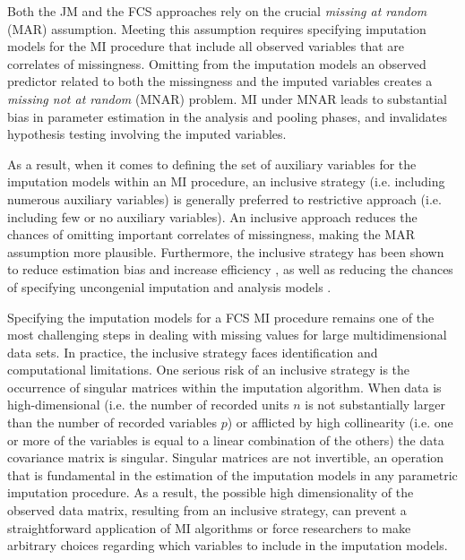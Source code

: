 Both the JM and the FCS approaches rely on the crucial \emph{missing at random} (MAR) assumption.
Meeting this assumption requires specifying imputation models for the MI procedure that include all observed
variables that are correlates of missingness.
Omitting from the imputation models an observed predictor related to both the missingness and the imputed variables 
creates a \emph{missing not at random} (MNAR) problem.
MI under MNAR leads to substantial bias in parameter estimation in the analysis and pooling phases, and 
invalidates hypothesis testing involving the imputed variables.

As a result, when it comes to defining the set of auxiliary variables for the imputation models within an MI procedure, 
an inclusive strategy (i.e. including numerous auxiliary variables) is generally preferred to restrictive approach 
(i.e. including few or no auxiliary variables).
An inclusive approach reduces the chances of omitting important correlates of missingness, making the MAR assumption 
more plausible.
Furthermore, the inclusive strategy has been shown to reduce estimation bias and increase efficiency \citep{collinsEtAl:2001},
as well as reducing the chances of specifying uncongenial imputation and analysis models \citep{meng:1994}.

Specifying the imputation models for a FCS MI procedure remains one of the most challenging steps in dealing
with missing values for large multidimensional data sets.
In practice, the inclusive strategy faces identification and computational limitations.
One serious risk of an inclusive strategy is the occurrence of singular matrices within the imputation algorithm.
When data is high-dimensional (i.e. the number of recorded units $n$ is not substantially larger than the number of recorded 
variables $p$) or afflicted by high collinearity (i.e. one or more of the variables is equal to a linear 
combination of the others) the data covariance matrix is singular.
Singular matrices are not invertible, an operation that is fundamental in the estimation of the imputation 
models in any parametric imputation procedure.
As a result, the possible high dimensionality of the observed data matrix, resulting from an inclusive strategy, 
can prevent a straightforward application of MI algorithms or force researchers to make arbitrary choices 
regarding which variables to include in the imputation models.

